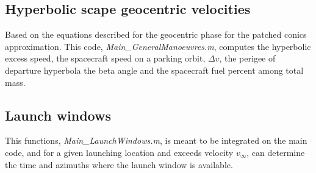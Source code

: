 		\subsection{Hyperbolic scape geocentric velocities}
		Based on the equations described for the geocentric phase for the patched conics approximation. This code, \textit{Main\_GeneralManoeuvres.m}, computes the hyperbolic excess speed, the spacecraft speed on a parking orbit, $\Delta v$, the perigee of departure hyperbola the beta angle and the spacecraft fuel percent among total mass.
		\subsection{Launch windows}
		This functions, \textit{Main\_LaunchWindows.m}, is meant to be integrated on the main code, and for a given launching location and exceeds velocity $v_\infty$, can determine the time and azimuths where the launch window is available.

